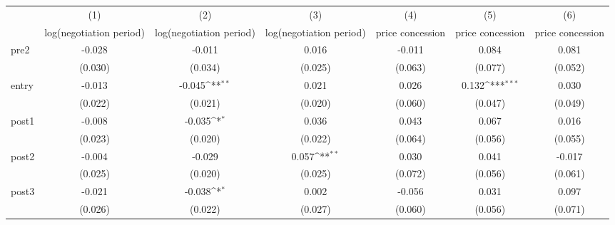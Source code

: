 {
\def\sym#1{\ifmmode^{#1}\else\(^{#1}\)\fi}
\begin{adjustbox}{max width=\textwidth}
\begin{tabular}{l*{6}{c}}
\toprule
            &\multicolumn{1}{c}{(1)}&\multicolumn{1}{c}{(2)}&\multicolumn{1}{c}{(3)}&\multicolumn{1}{c}{(4)}&\multicolumn{1}{c}{(5)}&\multicolumn{1}{c}{(6)}\\
            &\multicolumn{1}{c}{log(negotiation period)}&\multicolumn{1}{c}{log(negotiation period)}&\multicolumn{1}{c}{log(negotiation period)}&\multicolumn{1}{c}{price concession}&\multicolumn{1}{c}{price concession}&\multicolumn{1}{c}{price concession}\\
\midrule
pre2        &      -0.028         &      -0.011         &       0.016         &      -0.011         &       0.084         &       0.081         \\
            &     (0.030)         &     (0.034)         &     (0.025)         &     (0.063)         &     (0.077)         &     (0.052)         \\
\addlinespace
entry       &      -0.013         &      -0.045\sym{**} &       0.021         &       0.026         &       0.132\sym{***}&       0.030         \\
            &     (0.022)         &     (0.021)         &     (0.020)         &     (0.060)         &     (0.047)         &     (0.049)         \\
\addlinespace
post1       &      -0.008         &      -0.035\sym{*}  &       0.036         &       0.043         &       0.067         &       0.016         \\
            &     (0.023)         &     (0.020)         &     (0.022)         &     (0.064)         &     (0.056)         &     (0.055)         \\
\addlinespace
post2       &      -0.004         &      -0.029         &       0.057\sym{**} &       0.030         &       0.041         &      -0.017         \\
            &     (0.025)         &     (0.020)         &     (0.025)         &     (0.072)         &     (0.056)         &     (0.061)         \\
\addlinespace
post3       &      -0.021         &      -0.038\sym{*}  &       0.002         &      -0.056         &       0.031         &       0.097         \\
            &     (0.026)         &     (0.022)         &     (0.027)         &     (0.060)         &     (0.056)         &     (0.071)         \\

\end{tabular}
\end{adjustbox}}
